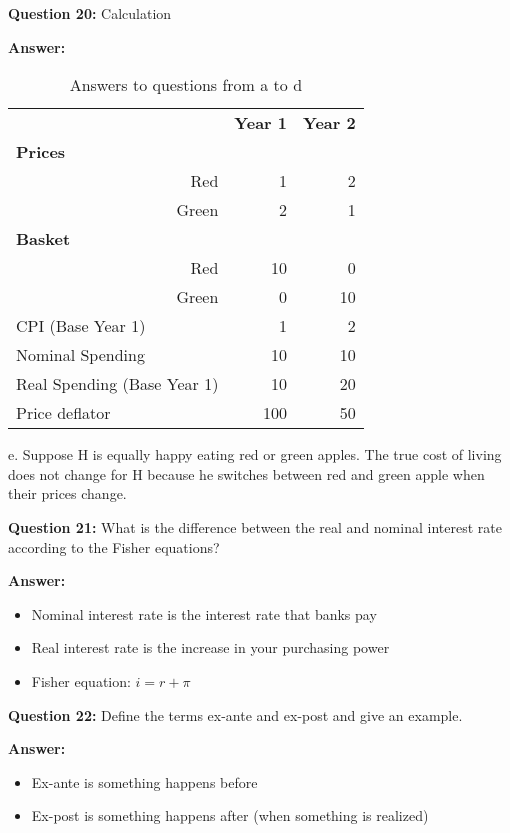 \documentclass[a4paper, 11pt]{article}
\begin{document}
\textbf{Question 20:} Calculation

\textbf{Answer:} 

\begin{table}[htbp]
  \centering
  \caption{Answers to questions from a to d}
    \begin{tabular}{lrr}
    \toprule
    \toprule
          & \multicolumn{1}{c}{\textbf{Year 1}} & \multicolumn{1}{c}{\textbf{Year 2}} \\
    \textbf{Prices} &       &  \\
    \multicolumn{1}{r}{Red} & 1     & 2 \\
    \multicolumn{1}{r}{Green} & 2     & 1 \\
    \textbf{Basket} &       &  \\
    \multicolumn{1}{r}{Red} & 10    & 0 \\
    \multicolumn{1}{r}{Green} & 0     & 10 \\
    \midrule
    CPI (Base Year 1) & 1     & 2 \\
    Nominal Spending & 10    & 10 \\
    Real Spending (Base Year 1) & 10    & 20 \\
    Price deflator & 100   & 50 \\
    \bottomrule
    \end{tabular}%
\end{table}%

\clearpage

e. Suppose H is equally happy eating red or green apples. The true cost of living does not change for H because he switches between red and green apple when their prices change.

\textbf{Question 21:} What is the difference between the real and nominal interest rate according to the Fisher equations?

\textbf{Answer:} 
\begin{itemize}
\item Nominal interest rate is the interest rate that banks pay
\item Real interest rate is the increase in your purchasing power
\item Fisher equation: $i = r + \pi$
\end{itemize}

\textbf{Question 22:} Define the terms ex-ante and ex-post and give an example.

\textbf{Answer:} 

\begin{itemize}
\item Ex-ante is something happens before
\item Ex-post is something happens after (when something is realized)
\end{itemize}
\end{document}
